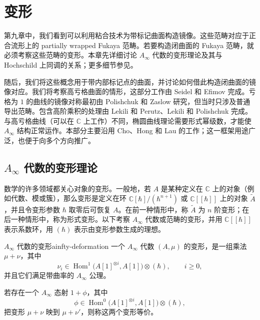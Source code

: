 \chapter{变形}\label{ch:deformation}

第九章中，我们看到可以利用粘合技术为带标记曲面构造镜像。这些范畴对应于正合流形上的 partially wrapped Fukaya 范畴。若要构造闭曲面的 Fukaya 范畴，就必须考察这些范畴的变形。本章先详细讨论 $A_\infty$ 代数的变形理论及其与 Hochschild 上同调的关系；更多细节参见。

随后，我们将这些概念用于带内部标记点的曲面，并讨论如何借此构造闭曲面的镜像对应。我们将考察高亏格曲面的情形，这部分工作由 Seidel 和 Efimov 完成。亏格为 $1$ 的曲线的镜像对称最初由 Polishchuk 和 Zaslow 研究，但当时只涉及普通导出范畴。包含高阶乘积的处理由 Lekili 和 Perutz、Lekili 和 Polishchuk 完成。与高亏格曲线（可以在 $\mathbb C$ 上工作）不同，椭圆曲线理论需要形式幂级数，才能使 $A_\infty$ 结构正常运作。本部分主要沿用 Cho、Hong 和 Lau 的工作；这一框架用途广泛，也便于向多个方向推广。

\section{\texorpdfstring{$A_\infty$}{A-infinity} 代数的变形理论}\label{sec:deformation-a-infinity}

数学的许多领域都关心对象的变形。一般地，若 $A$ 是某种定义在 $\mathbb C$ 上的对象（例如代数、模或簇），那么变形是定义在环 $\mathbb C[\hbar]/(\hbar^{n+1})$ 或 $\mathbb C[[\hbar]]$ 上的对象 $\widetilde A$，并且令变形参数 $\hbar$ 取零后可恢复 $A$。在前一种情形中，称 $\widetilde A$ 为 $n$ 阶变形；在后一种情形中，称为形式变形。以下考察 $A_\infty$ 代数或范畴的变形，并用 $\mathbb C[[\hbar]]$ 表示系数环，用 $(\hbar)$ 表示由变形参数生成的理想。

\begin{definition}{$A_\infty$ 代数的变形}{ainfty-deformation}
一个 $A_\infty$ 代数 $(A,\mu)$ 的变形，是一组乘法 $\mu+\nu$，其中
\[
  \nu_i\in\operatorname{Hom}^{1}\bigl(A[1]^{\otimes i},A[1]\bigr)\otimes(\hbar),\qquad i\geq 0,
\]
并且它们满足带曲率的 $A_\infty$ 公理。

若存在一个 $A_\infty$ 态射 $1+\phi$，其中
\[
  \phi\in\operatorname{Hom}^{0}\bigl(A[1]^{\otimes i},A[1]\bigr)\otimes(\hbar),
\]
把变形 $\mu+\nu$ 映到 $\mu+\nu'$，则称这两个变形等价。
\end{definition}

